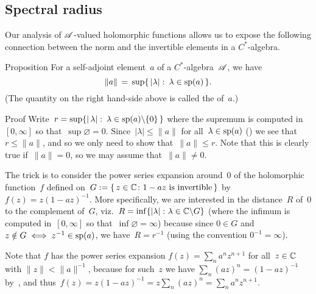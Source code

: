 \documentclass[a]{subfiles}
\begin{document}
\subsection{Spectral radius}
\begin{parsec}%
\begin{point}%
Our analysis of $\mathscr{A}$-valued
holomorphic functions
allows us to expose
the following connection
between the norm
and the invertible elements
in a $C^*$-algebra.
\end{point}
\begin{point}{Proposition}%
For a self-adjoint element~$a$ of a $C^*$-algebra~$\mathscr{A}$,
we have
\begin{equation*}
\|a\|\,=\,\sup\{\,\left|\lambda\right|\colon 
\,\lambda\in \mathrm{sp}(a)\,\}.
\end{equation*}
(The quantity on the right hand-side above
is called the  of~$a$.)%
\begin{point}{Proof}%
Write~$r=
\sup\{\left|\,\lambda\right|\colon\, \lambda\in \mathrm{sp}(a)\backslash\{0\}\,\}$
where the supremum is computed
in~$[0,\infty]$ so that~$\sup\varnothing=0$.
Since~$\left|\lambda\right| \leq \|a\|$
for all~$\lambda\in\mathrm{sp}(a)$
()
we see that~$r\leq \|a\|$,
and so we only need to show that~$\|a\|\leq r$. 
Note that this is clearly true if~$\|a\|=0$,
so we may assume that~$\|a\|\neq 0$.

The trick is to consider
the power series expansion
around~$0$ of the holomorphic function~$f$ defined
on~$G:=\{\,z\in \mathbb{C}\colon 1-az\text{ is invertible}\,\}$ 
by  $f(z)=z(1-az)^{-1}$.
More specifically,
we are interested in the distance~$R$
of~$0$ to the complement of~$G$,
viz.~$R= \inf\{\left|\lambda\right|\colon \lambda\in \mathbb{C}\backslash G\}$
(where the infimum is computed in~$[0,\infty]$
so that~$\inf\varnothing=\infty$)
because since $0\in G$
and $z\notin G\iff z^{-1}\in \mathrm{sp}(a)$,
we have~$R=r^{-1}$
(using the convention $0^{-1}=\infty$).

Note that $f$ has the power series expansion
$f(z) = \sum_n a^nz^{n+1}$
for all~$z\in \mathbb{C}$ with $\|z\|<\|a\|^{-1}$,
because for such~$z$
we have $\sum_n (az)^n=(1-az)^{-1}$
by~,
and thus~$f(z)=z(1-az)^{-1}=z\sum_n (az)^n = \sum_n a^nz^{n+1}$.


\end{point}
\end{point}
\end{parsec}
\end{document}
